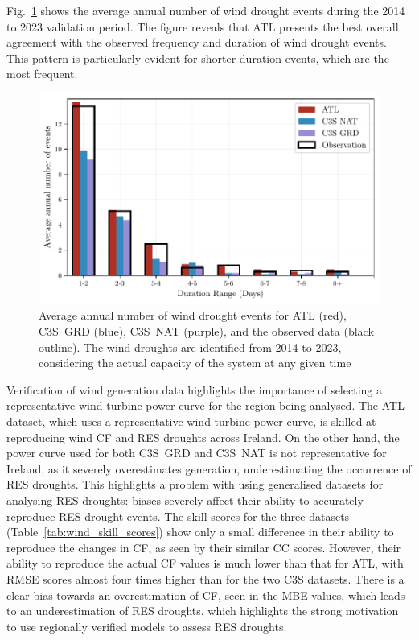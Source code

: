 \documentclass[preprint, 12pt]{elsarticle}
\begin{document}
Fig.~\ref{fig:bar_number_events_verification_wind} shows the average annual number of wind drought events during the 2014 to 2023 validation period. The figure reveals that ATL presents the best overall agreement with the observed frequency and duration of wind drought events. This pattern is particularly evident for shorter-duration events, which are the most frequent.

\begin{figure}[!ht]
	\centering
	\includegraphics[width=\textwidth]{verification_wind_number_events.pdf}
	\caption{Average annual number of wind drought events for ATL (red), C3S~GRD (blue), C3S~NAT (purple), and the observed data (black outline). The wind droughts are identified from 2014 to 2023, considering the actual capacity of the system at any given time}
	\label{fig:bar_number_events_verification_wind}
\end{figure}

Verification of wind generation data highlights the importance of selecting a representative wind turbine power curve for the region being analysed. The ATL dataset, which uses a representative wind turbine power curve, is skilled at reproducing wind CF and RES droughts across Ireland. On the other hand, the power curve used for both C3S~GRD and C3S~NAT is not representative for Ireland, as it severely overestimates generation, underestimating the occurrence of RES droughts. This highlights a problem with using generalised datasets for analysing RES droughts: biases severely affect their ability to accurately reproduce RES drought events. The skill scores for the three datasets (Table~\ref{tab:wind_skill_scores}) show only a small difference in their ability to reproduce the changes in CF, as seen by their similar CC scores. However, their ability to reproduce the actual CF values is much lower than that for ATL, with RMSE scores almost four times higher than for the two C3S datasets. There is a clear bias towards an overestimation of CF, seen in the MBE values, which leads to an underestimation of RES droughts, which highlights the strong motivation to use regionally verified models to assess RES droughts.
\end{document}
